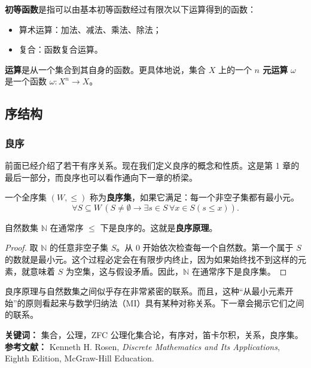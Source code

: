 \begin{definition}[初等函数]
\textbf{初等函数}是指可以由基本初等函数经过有限次以下运算得到的函数：
\begin{itemize}
    \item 算术运算：加法、减法、乘法、除法；
    \item 复合：函数复合运算。
\end{itemize}
\end{definition}

\begin{definition}[运算]
\textbf{运算}是从一个集合到其自身的函数。更具体地说，集合 $X$ 上的一个 \textbf{$n$ 元运算} $\omega$ 是一个函数 $\omega:X^n\to X$。
\end{definition}

\subsection{序结构}

\subsubsection{良序}

前面已经介绍了若干有序关系。现在我们定义良序的概念和性质。这是第 1 章的最后一部分，而良序也可以看作通向下一章的桥梁。

\begin{definition}[良序集]
一个全序集 $(W,\le)$ 称为\textbf{良序集}，如果它满足：每一个非空子集都有最小元。
\[
\forall S\subseteq W\,(S\ne\emptyset\to \exists s\in S\,\forall x\in S(s\le x)).
\]
\end{definition}

\begin{theorem}
自然数集 $\mathbb{N}$ 在通常序 $\le$ 下是良序的。这就是\textbf{良序原理}。
\end{theorem}

\begin{proof}
取 $\mathbb{N}$ 的任意非空子集 $S$。从 $0$ 开始依次检查每一个自然数。第一个属于 $S$ 的数就是最小元。这个过程必定会在有限步内终止，因为如果始终找不到这样的元素，就意味着 $S$ 为空集，这与假设矛盾。因此，$\mathbb{N}$ 在通常序下是良序集。
\end{proof}

良序原理与自然数集之间似乎存在非常紧密的联系。而且，这种“从最小元素开始”的原则看起来与数学归纳法（MI）具有某种对称关系。下一章会揭示它们之间的联系。

\noindent
\textbf{关键词：} 集合，公理，ZFC 公理化集合论，有序对，笛卡尔积，关系，良序集。\\
\textbf{参考文献：} Kenneth H. Rosen, \textit{Discrete Mathematics and Its Applications}, Eighth Edition, McGraw-Hill Education.


